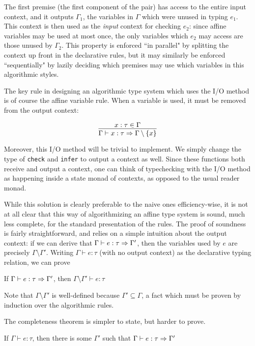 The first premise (the first component of the pair) has access to the entire input context, and it outputs $\Gamma_1$, the variables in $\Gamma$ which were unused in typing $e_1$. This context is then used as the \textit{input} context for checking $e_2$: since affine variables may be used at most once, the only variables which $e_2$ may access are those unused by $\Gamma_2$. This property is enforced ``in parallel" by splitting the context up front in the declarative rules, but it may similarly be enforced ``sequentially" by lazily deciding which premises may use which variables in this algorithmic styles.

The key rule in designing an algorithmic type system which uses the I/O method is of course the affine variable rule. When a variable is used, it must be removed from the output context:

$$
\infer{\Gamma \vdash x : \tau \gens \Gamma \setminus \{x\}}{x : \tau \in \Gamma}
$$

Moreover, this I/O method will be trivial to implement. We simply change the type of \texttt{check} and \texttt{infer} to output a context as well. Since these functions both receive and output a context, one can think of typechecking with the I/O method as happening inside a state monad of contexts, as opposed to the usual reader monad.

While this solution is clearly preferable to the naive ones efficiency-wise, it is not at all clear that this way of algorithmizing an affine type system is sound, much less complete, for the standard presentation of the rules. The proof of soundness is fairly straightforward, and relies on a simple intuition about the output context: if we can derive that $\Gamma \vdash e : \tau \Rightarrow \Gamma'$, then the variables used by $e$ are precisely $\Gamma \setminus \Gamma'$. Writing $\Gamma \vdash e : \tau$ (with no output context) as the declarative typing relation, we can prove

\begin{theorem}
If $\Gamma \vdash e : \tau \Rightarrow \Gamma'$, then $\Gamma \setminus \Gamma' \vdash e : \tau$
\end{theorem}

Note that $\Gamma \setminus \Gamma'$ is well-defined because $\Gamma' \subseteq \Gamma$, a fact which must be proven by induction over the algorithmic rules.

The completeness theorem is simpler to state, but harder to prove.

\begin{theorem}
If $\Gamma \vdash e : \tau$, then there is some $\Gamma'$ such that $\Gamma \vdash e : \tau \Rightarrow \Gamma'$
\end{theorem}

